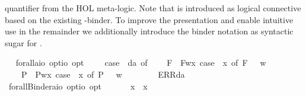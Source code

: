 \begin{isabellebody}
\begin{isamarkuptext}
  quantifier from the HOL meta-logic. Note that \isa{\isactrlbold {\isasymforall}} is introduced as logical connective
  based on the existing \isa{{\isasymlambda}}-binder. To improve the presentation and enable intuitive use 
  in the remainder we additionally
  introduce the binder notation  as syntactic sugar for .%
\end{isamarkuptext}\isamarkuptrue%
\ \isamarkupfalse%
\ forall{\isacharcolon}{\isacharcolon}{\isachardoublequoteopen}{\isacharparenleft}{\isacharprime}a{\isasymRightarrow}io\ opt{\isacharparenright}{\isasymRightarrow}io\ opt{\isachardoublequoteclose}\ {\isacharparenleft}{\isachardoublequoteopen}\isactrlbold {\isasymforall}{\isachardoublequoteclose}{\isacharparenright}\ \ {\isachardoublequoteopen}\isactrlbold {\isasymforall}{\isasymPhi}\ {\isasymequiv}\ case\ {\isacharparenleft}{\isasymPhi}\ da{\isacharparenright}\ of\isanewline
\ \ \ \ F{\isacharparenleft}{\isacharunderscore}{\isacharparenright}\ {\isasymRightarrow}\ F{\isacharparenleft}{\isasymlambda}w{\isachardot}{\isasymforall}x{\isachardot}\ case\ {\isacharparenleft}{\isasymPhi}\ x{\isacharparenright}\ of\ F{\isacharparenleft}{\isasympsi}{\isacharparenright}\ {\isasymRightarrow}\ {\isasympsi}\ w{\isacharparenright}\ {\isacharbar}\ \isanewline
\ \ \ \ P{\isacharparenleft}{\isacharunderscore}{\isacharparenright}\ {\isasymRightarrow}\ P{\isacharparenleft}{\isasymlambda}w{\isachardot}{\isasymforall}x{\isachardot}\ case\ {\isacharparenleft}{\isasymPhi}\ x{\isacharparenright}\ of\ P{\isacharparenleft}{\isasympsi}{\isacharparenright}\ {\isasymRightarrow}\ {\isasympsi}\ w{\isacharparenright}\ {\isacharbar}\ \isanewline
\ \ \ \ {\isacharunderscore}\ {\isasymRightarrow}\ ERR{\isacharparenleft}da{\isacharparenright}{\isachardoublequoteclose}\isanewline
\ \isamarkupfalse%
\ forallBinder{\isacharcolon}{\isacharcolon}{\isachardoublequoteopen}{\isacharparenleft}{\isacharprime}a{\isasymRightarrow}io\ opt{\isacharparenright}{\isasymRightarrow}io\ opt{\isachardoublequoteclose}\ {\isacharparenleft}\ {\isachardoublequoteopen}\isactrlbold {\isasymforall}{\isachardoublequoteclose}\ {\isacharbrackleft}{}{\isacharbrackright}\ {}{\isacharparenright}\ \ \ {\isachardoublequoteopen}\isactrlbold {\isasymforall}x{\isachardot}\ {\isasymphi}\ x\ {\isasymequiv}\ \isactrlbold {\isasymforall}{\isasymphi}{\isachardoublequoteclose}%

\end{isabellebody}
